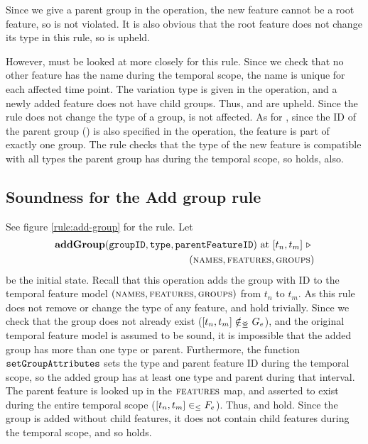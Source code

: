 Since we give a parent group in the operation, the new feature cannot be a root feature, so  is not violated. It is also obvious that the root feature does not change its type in this rule, so  is upheld. 

However,  must be looked at more closely for this rule. Since we check that no other feature has the name  during the temporal scope, the name is unique for each affected time point. The variation type is given in the operation, and a newly added feature does not have child groups. Thus,  and  are upheld. Since the rule does not change the type of a group,  is not affected. As for , since the ID of the parent group () is also specified in the operation, the feature is part of exactly one group. The rule checks that the type of the new feature is compatible with all types the parent group has during the temporal scope, so  holds, also.

\subsection{Soundness for the Add group rule}
\label{sub:soundness-for-the-add-group-rule}

See figure \vref{rule:add-group} for the  rule. 
Let 
\begin{equation*}
   \begin{split}
      \textbf{addGroup}(\var{groupID}, \var{type}, \var{parentFeatureID})\text{ at }\interval{t_n}{t_m}
      \shove \\
   (\names{}, \features{}, \groups{})
\end{split}
\end{equation*}
be the initial state. Recall that this operation adds the group with ID  to the temporal feature model $(\textsc{names}{}, \textsc{features}{}, \textsc{groups}{}{})$ from $t_n$ to $t_m$. As this rule does not remove or change the type of any feature,  and  hold trivially. Since we check that the group does not already exist ($\interval{t_n}{t_m} \notinnr G_e$), and the original temporal feature model is assumed to be sound, it is impossible that the added group has more than one type or parent. Furthermore, the function $\texttt{setGroupAttributes}$ sets the type and parent feature ID during the temporal scope, so the added group has at least one type and parent during that interval. The parent feature is looked up in the $\textsc{features}{}$ map, and asserted to exist during the entire temporal scope ($\interval{t_n}{t_m} \inn F_e$). Thus,  and  hold. Since the group is added without child features, it does not contain child features during the temporal scope, and so  holds.

